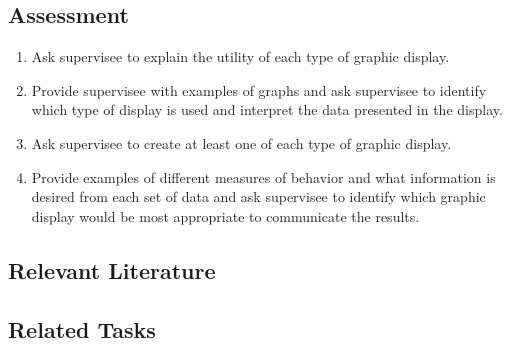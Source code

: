 \subsection{Assessment}
\begin{enumerate}
\item Ask supervisee to explain the utility of each type of graphic display.
\item Provide supervisee with examples of graphs and ask supervisee to identify which type of display is used and interpret the data presented in the display.
\item Ask supervisee to create at least one of each type of graphic display.
\item Provide examples of different measures of behavior and what information is desired from each set of data and ask supervisee to identify which graphic display would be most appropriate to communicate the results.
%
\end{enumerate}
%
\subsection{Relevant Literature}
\begin{refsection}
\nocite{test,alang2017police,clayton2018black}
\printbibliography[heading=none]
\end{refsection}
%
\subsection{Related Tasks}
\fouraTen{}\\
\fouraEleven{}\\
\fouraTwelve{}\\
\fourFKFourtySeven{}\\
\fourbThree{}\\
\fourhFour{}\\
\fourhFive{}\\
%
%
%
%
%
%
\section[\fourhFour{}]{\fourhFour{}%
              }
